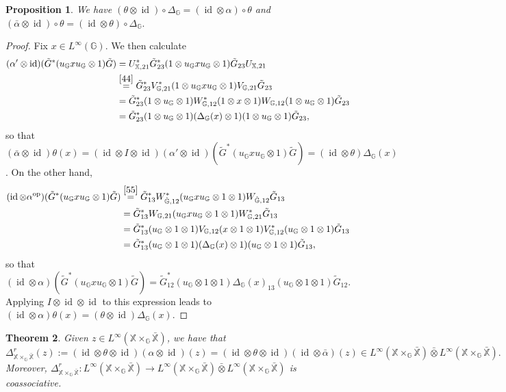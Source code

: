 \documentclass[reqno]{amsart}
\numberwithin{equation}{section}
\newtheorem{Theorem}{Theorem}[section]
\newtheorem{Prop}[Theorem]{Proposition}
\newcommand\XGX{\X\times_\G \bar{\X}}
\DeclareMathOperator{\id}{\mathrm{id}}
\newcommand{\op}{\mathrm{op}}
\newcommand{\G}{\mathbb{G}}
\newcommand{\X}{\mathbb{X}}
\newcommand{\ovot}{\bar{\otimes}}
\begin{document}
\begin{Prop}\label{identities} We have
$(\theta \otimes \id)\circ \Delta_\G= (\id \otimes \alpha)\circ \theta$ and $(\bar{\alpha}\otimes \id)\circ \theta = (\id \otimes \theta)\circ \Delta_\G.$
\end{Prop}
\begin{proof} Fix $x\in L^\infty(\G)$. We then calculate
    \begin{align*}
        (\alpha'\otimes \id)(\tilde{G}^*(u_\G xu_\G \otimes 1)\tilde{G})&= U_{\X,21}^* \tilde{G}_{23}^* (1\otimes u_\G x u_\G\otimes 1) \tilde{G}_{23}U_{\X,21}\\
        &\stackrel{\ref{44}}= \tilde{G}_{23}^* V_{\G,21}^* (1\otimes u_\G x u_\G \otimes 1)V_{\G,21}\tilde{G}_{23}\\
        &= \tilde{G}_{23}^* (1\otimes u_\G \otimes 1)W_{\G,12}^*(1\otimes x\otimes 1)W_{\G,12} (1\otimes u_\G \otimes 1)\tilde{G}_{23}\\
        &= \tilde{G}_{23}^*(1\otimes u_\G \otimes 1)(\Delta_\G(x)\otimes 1)(1\otimes u_\G \otimes 1)\tilde{G}_{23},
    \end{align*}
    so that 
   $(\bar{\alpha}\otimes \id)\theta(x)= (\id \otimes I \otimes \id)(\alpha'\otimes \id)(\tilde{G}^*(u_\G x u_\G \otimes 1)\tilde{G})= (\id \otimes \theta)\Delta_\G(x)$. On the other hand,
   \begin{align*}
       (\id \otimes \alpha^{\op})(\tilde{G}^*(u_\G x u_\G \otimes 1)\tilde{G}) &\stackrel{\ref{55}}= \tilde{G}_{13}^*W_{\hat{\G},12}^* (u_\G x u_\G \otimes 1 \otimes 1) W_{\hat{\G},12}\tilde{G}_{13}\\
       &= \tilde{G}_{13}^* W_{\G,21}(u_\G x u_\G \otimes 1\otimes 1)W_{\G,21}^* \tilde{G}_{13}\\
       &= \tilde{G}_{13}^* (u_\G \otimes 1 \otimes 1)V_{\G,12}(x\otimes 1 \otimes 1)V_{\G,12}^* (u_\G \otimes 1 \otimes 1)\tilde{G}_{13}\\
       &= \tilde{G}_{13}^*(u_\G \otimes 1 \otimes 1)(\Delta_\G(x)\otimes 1)(u_\G \otimes 1 \otimes 1)\tilde{G}_{13},
   \end{align*}
   so that
   $(\id \otimes \alpha)(\tilde{G}^*(u_\G xu_\G \otimes 1)\tilde{G}) = \tilde{G}_{12}^* (u_\G \otimes 1 \otimes 1)\Delta_\G(x)_{13}(u_\G \otimes 1 \otimes 1)\tilde{G}_{12}.$
   Applying $I\otimes \id \otimes \id$ to this expression leads to $(\id \otimes \alpha)\theta(x)=(\theta \otimes \id)\Delta_\G(x)$.
\end{proof}

\begin{Theorem}\label{mainsec3} Given $z\in L^\infty(\XGX)$, we have that
$$\Delta_{\XGX}^r(z):= (\id \otimes \theta \otimes \id)(\alpha\otimes \id)(z) = (\id \otimes \theta \otimes \id)(\id \otimes \bar{\alpha})(z)\in L^\infty(\XGX)\ovot L^\infty(\XGX).$$
Moreover, $\Delta_{\XGX}^r: L^\infty(\XGX)\to L^\infty(\XGX)\ovot L^\infty(\XGX)$ is coassociative.
\end{Theorem}
\end{document}
